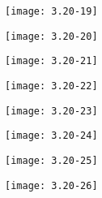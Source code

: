 \begin{figure}[H] %
	\begin{minipage}{\linewidth}
		\texttt{[image: 3.20-19]}
	\end{minipage}
\end{figure}

\begin{figure}[H] %
	\begin{minipage}{\linewidth}
		\texttt{[image: 3.20-20]}
	\end{minipage}
\end{figure}

\begin{figure}[H] %
	\begin{minipage}{\linewidth}
		\texttt{[image: 3.20-21]}
	\end{minipage}
\end{figure}

\begin{figure}[H] %
	\begin{minipage}{\linewidth}
		\texttt{[image: 3.20-22]}
	\end{minipage}
\end{figure}

\begin{figure}[H] %
	\begin{minipage}{\linewidth}
		\texttt{[image: 3.20-23]}
	\end{minipage}
\end{figure}

\begin{figure}[H] %
	\begin{minipage}{\linewidth}
		\texttt{[image: 3.20-24]}
	\end{minipage}
\end{figure}

\begin{figure}[H] %
	\begin{minipage}{\linewidth}
		\texttt{[image: 3.20-25]}
	\end{minipage}
\end{figure}

\begin{figure}[H] %
	\begin{minipage}{\linewidth}
		\texttt{[image: 3.20-26]}
	\end{minipage}
\end{figure}













